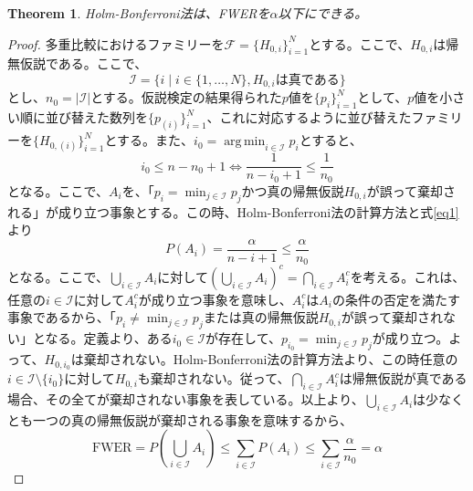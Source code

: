 \documentclass[12pt]{jarticle}
\numberwithin{equation}{section}    %
\numberwithin{figure}{section}      %
\numberwithin{table}{section}      %
\newtheorem{theorem}{Theorem}
\DeclareMathOperator*{\argmin}{arg\,min}
\begin{document}
\begin{theorem}
    Holm-Bonferroni法は、FWERを$\alpha$以下にできる。
\end{theorem}
\begin{proof}
    多重比較におけるファミリーを$\mathcal{F} = \{H_{0, i}\}_{i = 1}^{N}$とする。ここで、$H_{0, i}$は帰無仮説である。ここで、
    \begin{equation}
        \mathcal{I} = \{i \mid i \in \{1, \ldots, N\}, H_{0, i}は真である\}
    \end{equation}
    とし、$n_{0} = |\mathcal{I}|$とする。仮説検定の結果得られた$p$値を$\{p_{i}\}_{i = 1}^{N}$として、$p$値を小さい順に並び替えた数列を$\{p_{(i)}\}_{i = 1}^{N}$、これに対応するように並び替えたファミリーを$\{H_{0, (i)}\}_{i = 1}^{N}$とする。また、$i_{0} = \argmin_{i \in \mathcal{I}} p_{i}$とすると、
    \begin{equation}
        \label{eq1}
        i_{0} \le n - n_{0} + 1 \Leftrightarrow  \frac{1}{n - i_{0} + 1} \le \frac{1}{n_{0}}
    \end{equation}
    となる。ここで、$A_{i}$を、「$p_{i} = \min_{j \in \mathcal{I}} p_{j}$かつ真の帰無仮説$H_{0, i}$が誤って棄却される」が成り立つ事象とする。この時、Holm-Bonferroni法の計算方法と式\eqref{eq1}より
    \begin{equation}
        P(A_{i}) = \frac{\alpha}{n - i + 1} \le \frac{\alpha}{n_{0}}
    \end{equation}
    となる。ここで、$\bigcup_{i \in \mathcal{I}} A_{i}$に対して$\left(\bigcup_{i \in \mathcal{I}} A_{i}\right)^{c} = \bigcap_{i \in \mathcal{I}} A_{i}^{c}$を考える。これは、任意の$i \in \mathcal{I}$に対して$A_{i}^{c}$が成り立つ事象を意味し、$A_{i}^{c}$は$A_{i}$の条件の否定を満たす事象であるから、「$p_{i} \neq \min_{j \in \mathcal{I}} p_{j}$または真の帰無仮説$H_{0, i}$が誤って棄却されない」となる。定義より、ある$i_{0} \in \mathcal{I}$が存在して、$p_{i_{0}} = \min_{j \in \mathcal{I}} p_{j}$が成り立つ。よって、$H_{0, i_{0}}$は棄却されない。Holm-Bonferroni法の計算方法より、この時任意の$i \in \mathcal{I} \setminus \{i_{0}\}$に対して$H_{0, i}$も棄却されない。従って、$\bigcap_{i \in \mathcal{I}} A_{i}^{c}$は帰無仮説が真である場合、その全てが棄却されない事象を表している。以上より、$\bigcup_{i \in \mathcal{I}} A_{i}$は少なくとも一つの真の帰無仮説が棄却される事象を意味するから、
    \begin{equation}
        \text{FWER} = P\left(\bigcup_{i \in \mathcal{I}} A_{i}\right) \le \sum_{i \in \mathcal{I}} P(A_{i}) \le \sum_{i \in \mathcal{I}} \frac{\alpha}{n_{0}} = \alpha
    \end{equation}
\end{proof}
\end{document}

